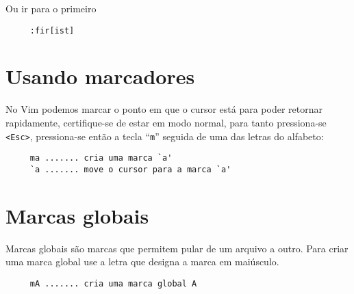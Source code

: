 Ou ir para o primeiro

\begin{verbatim}
     :fir[ist]
\end{verbatim}

\section{Usando marcadores}
\label{Usando marcadores}

No Vim podemos marcar o ponto em que o cursor está para poder retornar
rapidamente, certifique-se de estar em modo normal, para tanto pressiona-se \verb+<Esc>+,
pressiona-se então a tecla ``\verb+m+'' seguida de uma das letras do alfabeto:

\begin{verbatim}
     ma ....... cria uma marca `a'
     `a ....... move o cursor para a marca `a'
\end{verbatim}

\section{Marcas globais}
\label{Marcas globais}
Marcas globais são marcas que permitem pular de um arquivo a outro.
Para criar uma marca global use a letra que designa a marca em
maiúsculo.

\begin{verbatim}
     mA ....... cria uma marca global A
\end{verbatim}
